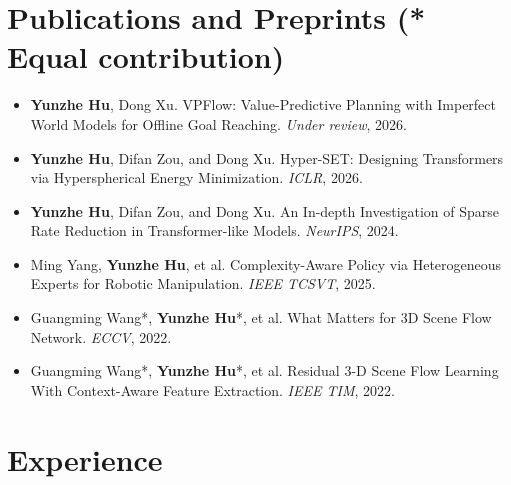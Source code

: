 \documentclass[letterpaper,11pt]{article}
\newcommand{\resumeItem}[1]{
  \item\small{
    {#1 \vspace{-2pt}}
  }
}
\newcommand{\resumeSubHeadingListStart}{\begin{itemize}[leftmargin=0.15in, label={}]}
\newcommand{\resumeItemListStart}{\begin{itemize}}
\newcommand{\resumeItemListEnd}{\end{itemize}\vspace{-5pt}}
\begin{document}
\section{Publications and Preprints {\normalfont\small (* Equal contribution)}}
\begin{itemize}[leftmargin=0.15in, itemsep=3pt,topsep=2pt]
    \resumeItem{\textbf{Yunzhe Hu}, Dong Xu. VPFlow: Value-Predictive Planning with Imperfect World Models for Offline Goal Reaching. \emph{Under review}, 2026.}
    \resumeItem{\textbf{Yunzhe Hu}, Difan Zou, and Dong Xu. Hyper-SET: Designing Transformers via Hyperspherical Energy Minimization. \emph{ICLR}, 2026.}
    \resumeItem{\textbf{Yunzhe Hu}, Difan Zou, and Dong Xu. An In-depth Investigation of Sparse Rate Reduction in Transformer-like Models. \emph{NeurIPS}, 2024.}
    \resumeItem{Ming Yang, \textbf{Yunzhe Hu}, et al. Complexity-Aware Policy via Heterogeneous Experts for Robotic Manipulation. \emph{IEEE TCSVT}, 2025.}
    \resumeItem{Guangming Wang*, \textbf{Yunzhe Hu}*, et al. What Matters for 3D Scene Flow Network. \emph{ECCV}, 2022.}
    \resumeItem{Guangming Wang*, \textbf{Yunzhe Hu}*, et al. Residual 3-D Scene Flow Learning With Context-Aware Feature Extraction. \emph{IEEE TIM}, 2022.}
\resumeItemListEnd

\section{Experience}
  \resumeSubHeadingListStart


\end{itemize}
\end{document}
